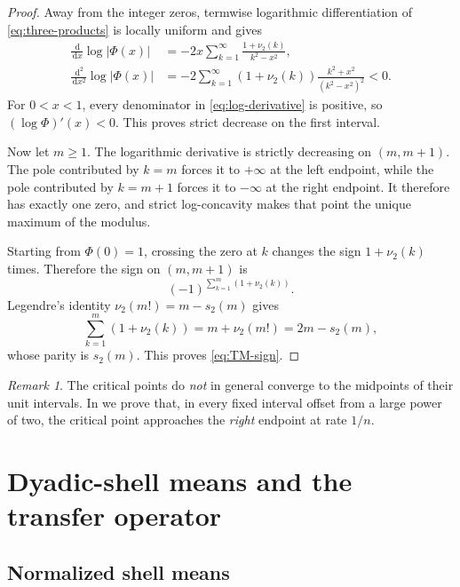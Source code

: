 \documentclass[11pt,oneside]{article}
\theoremstyle{definition}
\theoremstyle{remark}
\newtheorem{remark}[theorem]{Remark}
\newcommand{\dd}{\,\mathrm d}
\newcommand{\Phiup}{\Phi}
\newcommand{\vtwo}{\nu_2}
\newcommand{\abs}[1]{\left|#1\right|}
\begin{document}
\begin{proof}
Away from the integer zeros, termwise logarithmic differentiation of
\eqref{eq:three-products} is locally uniform and gives
\begin{align}
 \frac{\dd}{\dd x}\log\abs{\Phiup(x)}
 &=-2x\sum_{k=1}^{\infty}\frac{1+\vtwo(k)}{k^2-x^2},
 \label{eq:log-derivative}\\
 \frac{\dd^2}{\dd x^2}\log\abs{\Phiup(x)}
 &=-2\sum_{k=1}^{\infty}(1+\vtwo(k))
   \frac{k^2+x^2}{(k^2-x^2)^2}<0.
 \label{eq:strict-log-concavity}
\end{align}
For $0<x<1$, every denominator in \eqref{eq:log-derivative} is positive, so
$(\log\Phiup)'(x)<0$.  This proves strict decrease on the first interval.

Now let $m\ge1$.  The logarithmic derivative is strictly decreasing on $(m,m+1)$.
The pole contributed by $k=m$ forces it to $+\infty$ at the left endpoint, while the pole
contributed by $k=m+1$ forces it to $-\infty$ at the right endpoint.  It therefore has
exactly one zero, and strict log-concavity makes that point the unique maximum of the modulus.

Starting from $\Phiup(0)=1$, crossing the zero at $k$ changes the sign
$1+\vtwo(k)$ times.  Therefore the sign on $(m,m+1)$ is
\[
 (-1)^{\sum_{k=1}^{m}(1+\vtwo(k))}.
\]
Legendre's identity $\vtwo(m!)=m-s_2(m)$ gives
\[
 \sum_{k=1}^{m}(1+\vtwo(k))=m+\vtwo(m!)=2m-s_2(m),
\]
whose parity is $s_2(m)$.  This proves \eqref{eq:TM-sign}.
\end{proof}

\begin{remark}
The critical points do \emph{not} in general converge to the midpoints of their unit
intervals.  In  we prove that, in every fixed interval offset
from a large power of two, the critical point approaches the \emph{right} endpoint at rate
$1/n$.
\end{remark}

\section{Dyadic-shell means and the transfer operator}
\label{sec:Lq-spectrum}

\subsection{Normalized shell means}
\end{document}
